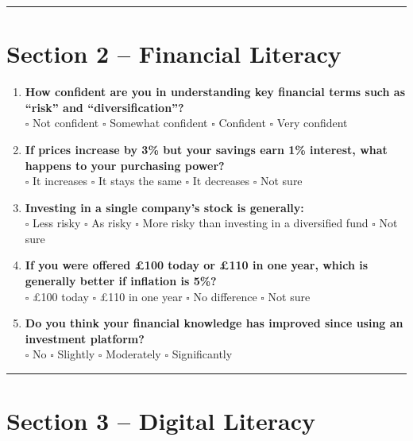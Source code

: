 \documentclass[11pt,english]{article}
\begin{document}
\vspace{0.5em}
\hrule
\vspace{0.8em}

\section*{Section 2 – Financial Literacy}

\begin{enumerate}[resume,leftmargin=1.5em,label=\textbf{\arabic*.}]
\item \textbf{How confident are you in understanding key financial terms such as ``risk'' and ``diversification''?} \\
$\square$ Not confident \quad $\square$ Somewhat confident \quad $\square$ Confident \quad $\square$ Very confident

\item \textbf{If prices increase by 3\% but your savings earn 1\% interest, what happens to your purchasing power?} \\
$\square$ It increases \quad $\square$ It stays the same \quad $\square$ It decreases \quad $\square$ Not sure

\item \textbf{Investing in a single company's stock is generally:} \\
$\square$ Less risky \quad $\square$ As risky \quad $\square$ More risky than investing in a diversified fund \quad $\square$ Not sure

\item \textbf{If you were offered £100 today or £110 in one year, which is generally better if inflation is 5\%?} \\
$\square$ £100 today \quad $\square$ £110 in one year \quad $\square$ No difference \quad $\square$ Not sure

\item \textbf{Do you think your financial knowledge has improved since using an investment platform?} \\
$\square$ No \quad $\square$ Slightly \quad $\square$ Moderately \quad $\square$ Significantly
\end{enumerate}

\vspace{0.5em}
\hrule
\vspace{0.8em}

\section*{Section 3 – Digital Literacy}
\end{document}
